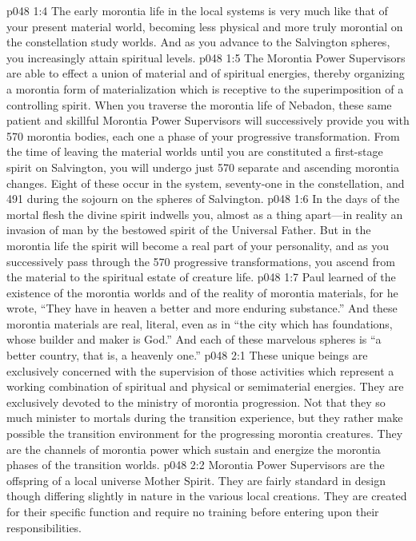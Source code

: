 \pc \vs p048 1:4 The early morontia life in the local systems is very much like that of your present material world, becoming less physical and more truly morontial on the constellation study worlds. And as you advance to the Salvington spheres, you increasingly attain spiritual levels.
\vs p048 1:5 The Morontia Power Supervisors are able to effect a union of material and of spiritual energies, thereby organizing a morontia form of materialization which is receptive to the superimposition of a controlling spirit. When you traverse the morontia life of Nebadon, these same patient and skillful Morontia Power Supervisors will successively provide you with 570 morontia bodies, each one a phase of your progressive transformation. From the time of leaving the material worlds until you are constituted a first\hyp{}stage spirit on Salvington, you will undergo just 570 separate and ascending morontia changes. Eight of these occur in the system, seventy\hyp{}one in the constellation, and 491 during the sojourn on the spheres of Salvington.
\vs p048 1:6 In the days of the mortal flesh the divine spirit indwells you, almost as a thing apart---in reality an invasion of man by the bestowed spirit of the Universal Father. But in the morontia life the spirit will become a real part of your personality, and as you successively pass through the 570 progressive transformations, you ascend from the material to the spiritual estate of creature life.
\pc \vs p048 1:7 Paul learned of the existence of the morontia worlds and of the reality of morontia materials, for he wrote, “They have in heaven a better and more enduring substance.” And these morontia materials are real, literal, even as in “the city which has foundations, whose builder and maker is God.” And each of these marvelous spheres is “a better country, that is, a heavenly one.”
\vs p048 2:1 These unique beings are exclusively concerned with the supervision of those activities which represent a working combination of spiritual and physical or semimaterial energies. They are exclusively devoted to the ministry of morontia progression. Not that they so much minister to mortals during the transition experience, but they rather make possible the transition environment for the progressing morontia creatures. They are the channels of morontia power which sustain and energize the morontia phases of the transition worlds.
\vs p048 2:2 Morontia Power Supervisors are the offspring of a local universe Mother Spirit. They are fairly standard in design though differing slightly in nature in the various local creations. They are created for their specific function and require no training before entering upon their responsibilities.
